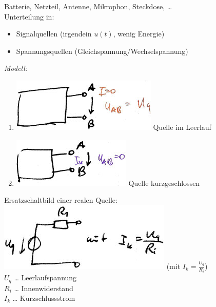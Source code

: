 Batterie, Netzteil, Antenne, Mikrophon, Steckdose, …\smallskip\\
Unterteilung in:
\begin{itemize}
\item Signalquellen (irgendein $u(t)$, wenig Energie)
\item Spannungsquellen (Gleichspannung/Wechselspannung)
\end{itemize}
\emph{Modell:}
\begin{enumerate}
\item \includegraphics[scale=.75]{Abbildungen/ABB307} Quelle im Leerlauf
\item \includegraphics[scale=.75]{Abbildungen/ABB308} Quelle kurzgeschlossen
\end{enumerate}
Ersatzschaltbild einer realen Quelle:\\
\includegraphics[scale=.75]{Abbildungen/ABB309} (mit $I_k=\frac{U_q}{R_i}$)\\
$U_q$ … Leerlaufspannung\\
$R_i$ … Innenwiderstand\\
$I_k$ … Kurzschlussstrom

